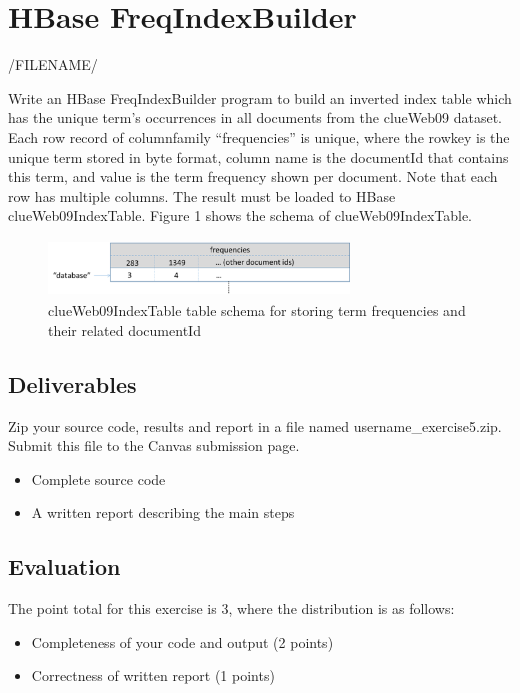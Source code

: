 \section{HBase FreqIndexBuilder}
/FILENAME/



Write an HBase FreqIndexBuilder program to build an inverted index table which
has the unique term's occurrences in all documents from the clueWeb09 dataset.
Each row record of columnfamily ``frequencies'' is unique, where the rowkey is
the unique term stored in byte format, column name is the documentId that
contains this term, and value is the term frequency shown per document. Note
that each row has multiple columns. The result must be loaded to HBase
clueWeb09IndexTable. Figure 1 shows the schema of clueWeb09IndexTable.

\begin{figure}[!htbp]
\includegraphics[width=8cm,height=1.5cm]{section/icloud/assignment/exercise5/p5-1}
\centering
\caption{clueWeb09IndexTable table schema for storing term frequencies and their related documentId}
\end{figure}

\subsection{Deliverables}
Zip your source code, results and report in a file named
username\_exercise5.zip. Submit this file to the Canvas submission page.

\begin{itemize}
\item Complete source code
\item A written report describing the main steps
\end{itemize}

\subsection{Evaluation}
The point total for this exercise is 3, where the distribution is as follows:
\begin{itemize}
\item Completeness of your code and output (2 points)
\item Correctness of written report (1 points)
\end{itemize}

